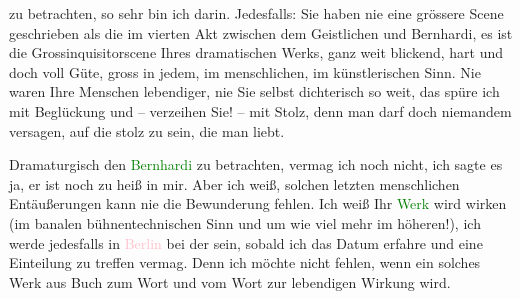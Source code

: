                     zu betrachten, so sehr bin ich darin. Jedesfalls: Sie haben nie eine grössere
                    Scene geschrieben als die im vierten Akt zwischen dem Geistlichen und Bernhardi,
                    es ist die Grossinquisitorscene Ihres dramatischen Werks, ganz weit blickend,
                    hart und doch voll Güte, gross in jedem, im menschlichen, im künstlerischen
                    Sinn. Nie waren Ihre Menschen lebendiger, nie Sie selbst dichterisch so weit,
                    das spüre ich mit Beglückung und – verzeihen Sie! – mit Stolz, denn man darf
                    doch niemandem versagen, auf die stolz zu sein, die man liebt.\pend
           
\pstart
           Dramaturgisch den \textcolor{green}{Bernhardi}\ledrightnote{\textcolor{green}{Professor Bernhardi. Komödie in fünf Akten}} zu betrachten,
                    vermag ich noch nicht, ich sagte es ja, er ist noch zu heiß in mir. Aber ich
                    weiß, solchen letzten menschlichen Entäußerungen kann nie {\pb}die Bewunderung fehlen. Ich weiß
                    Ihr \textcolor{green}{Werk}\ledrightnote{{$\rightarrow$}\emph{\textcolor{green}{Professor Bernhardi. Komödie in fünf Akten}}} wird wirken (im
                    banalen bühnentechnischen Sinn und um wie viel mehr im höheren!), ich werde
                    jedesfalls in \textcolor{pink}{Berlin}\ledrightnote{\textcolor{pink}{Berlin}} bei der \label{K_L03639-3v}\label{K_L03639-3} sein, sobald ich das Datum
                    erfahre und eine Einteilung zu treffen vermag. Denn ich möchte nicht fehlen,
                    wenn ein solches Werk aus Buch zum Wort und vom Wort zur lebendigen Wirkung
                    wird.\pend
           
